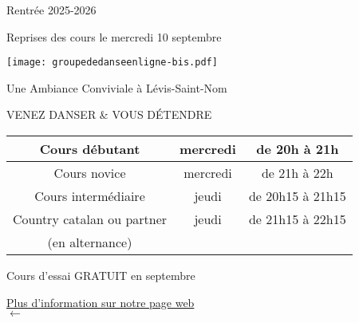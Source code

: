 \documentclass[12pt,a4paper]{article}
\newcommand{\logo}{\makebox[56mm][c]{\rule{0mm}{66mm}\raisebox{12mm}{\texttt{[image: static/images/aldc-final.pdf]}}}}
\begin{document}

\vspace*{-20mm}\hspace*{-15mm}



\begin{center}

\bfseries
\color{orange!75!black}

\LARGE

Rentrée 2025-2026

 Reprises des cours le mercredi 10 septembre

\vfill

\texttt{[image: groupededanseenligne-bis.pdf]}

\color{green!50!black}%
Une Ambiance Conviviale à Lévis-Saint-Nom

\color{blue!50!black}%
VENEZ DANSER \& VOUS DÉTENDRE

\vfill

\large
\setlength\arrayrulewidth{2pt}
\color{brown!50!black}
\begin{tabular}{|c|c|c|}
  \hline
  \rowcolor{orange!10}
  Cours débutant & mercredi & de 20h à 21h \\
  \hline
  \rowcolor{orange!20}
  Cours novice & mercredi & de 21h à 22h \\
  \hline
  \rowcolor{orange!30}
  Cours intermédiaire & jeudi & de 20h15 à 21h15 \\
  \hline
  \rowcolor{green!20}%
  \color{green!25!black}%
  Country catalan ou partner & jeudi & de 21h15 à 22h15 \\
  \rowcolor{green!20}%
  \color{green!25!black}%
  (en alternance) &  &  \\
  \hline
\end{tabular}
\vfill

\Large

\color{red!70!black}%
Cours d'essai GRATUIT en septembre

\vfill

\href{https://alevisdanse.github.io}{}
\qquad
\begin{minipage}[c]{0.45\textwidth}
  \Huge\color{black!50!blue}  \href{https://alevisdanse.github.io}{Plus d'information sur notre page web \\
    $\longleftarrow$}
\end{minipage}

\end{center}
\end{document}
